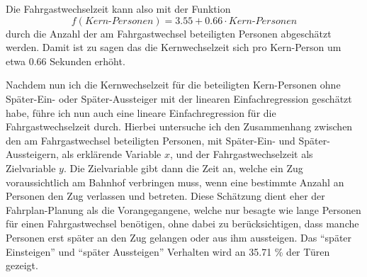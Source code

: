 Die Fahrgastwechselzeit kann also mit der Funktion 
\begin{equation}
f(Kern\text{-}Personen) = 3.55 + 0.66 \cdot Kern\text{-}Personen
\end{equation}  
durch die Anzahl der am Fahrgastwechsel beteiligten Personen abgeschätzt werden. Damit ist zu sagen das die Kernwechselzeit sich pro Kern-Person um etwa $0.66$ Sekunden erhöht.

Nachdem nun ich die Kernwechselzeit für die beteiligten Kern-Personen ohne Später-Ein- oder Später-Aussteiger mit der linearen Einfachregression geschätzt habe, führe ich nun auch eine lineare Einfachregression für die Fahrgastwechselzeit durch. Hierbei untersuche ich den Zusammenhang zwischen den am Fahrgastwechsel beteiligten Personen, mit Später-Ein- und Später-Aussteigern, als erklärende Variable $x$, und der Fahrgastwechselzeit als Zielvariable $y$. Die Zielvariable gibt dann die Zeit an, welche ein Zug voraussichtlich am Bahnhof verbringen muss, wenn eine bestimmte Anzahl an Personen den Zug verlassen und betreten. Diese Schätzung dient eher der Fahrplan-Planung als die Vorangegangene, welche nur besagte wie lange Personen für einen Fahrgastwechsel benötigen, ohne dabei zu berücksichtigen, dass manche Personen erst später an den Zug gelangen oder aus ihm aussteigen. Das "`später Einsteigen"' und "`später Aussteigen"' Verhalten wird an 35.71 \% der Türen gezeigt.

